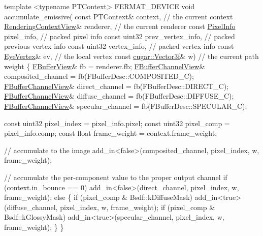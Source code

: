 \begin{DoxyCodeInclude}
    \textcolor{keyword}{template} <\textcolor{keyword}{typename} PTContext>
    FERMAT\_DEVICE
    \textcolor{keywordtype}{void} accumulate\_emissive(
        \textcolor{keyword}{const} PTContext&            context,                \textcolor{comment}{// the current context}
              \hyperlink{struct_rendering_context_view}{RenderingContextView}& renderer,               \textcolor{comment}{// the current renderer}
        \textcolor{keyword}{const} \hyperlink{union_pixel_info}{PixelInfo}                pixel\_info,             \textcolor{comment}{// packed pixel info}
        \textcolor{keyword}{const} uint32                prev\_vertex\_info,       \textcolor{comment}{// packed previous vertex info}
        \textcolor{keyword}{const} uint32                vertex\_info,            \textcolor{comment}{// packed vertex info}
        \textcolor{keyword}{const} \hyperlink{struct_eye_vertex}{EyeVertex}&           ev,                     \textcolor{comment}{// the local vertex}
        \textcolor{keyword}{const} \hyperlink{structcugar_1_1_vector}{cugar::Vector3f}&       w)                      \textcolor{comment}{// the current path weight}
    \{
        \hyperlink{struct_f_buffer_view}{FBufferView}& fb = renderer.fb;
        \hyperlink{struct_f_buffer_channel_view}{FBufferChannelView}& composited\_channel = fb(FBufferDesc::COMPOSITED\_C);
        \hyperlink{struct_f_buffer_channel_view}{FBufferChannelView}& direct\_channel     = fb(FBufferDesc::DIRECT\_C);
        \hyperlink{struct_f_buffer_channel_view}{FBufferChannelView}& diffuse\_channel    = fb(FBufferDesc::DIFFUSE\_C);
        \hyperlink{struct_f_buffer_channel_view}{FBufferChannelView}& specular\_channel   = fb(FBufferDesc::SPECULAR\_C);

        \textcolor{keyword}{const} uint32 pixel\_index = pixel\_info.pixel;
        \textcolor{keyword}{const} uint32 pixel\_comp  = pixel\_info.comp;
        \textcolor{keyword}{const} \textcolor{keywordtype}{float} frame\_weight = context.frame\_weight;

        \textcolor{comment}{// accumulate to the image}
        add\_in<false>(composited\_channel, pixel\_index, w, frame\_weight);

        \textcolor{comment}{// accumulate the per-component value to the proper output channel}
        \textcolor{keywordflow}{if} (context.in\_bounce == 0)
            add\_in<false>(direct\_channel, pixel\_index, w, frame\_weight);
        \textcolor{keywordflow}{else}
        \{
            \textcolor{keywordflow}{if} (pixel\_comp & Bsdf::kDiffuseMask) add\_in<true>(diffuse\_channel,  pixel\_index, w, 
      frame\_weight);
            \textcolor{keywordflow}{if} (pixel\_comp & Bsdf::kGlossyMask)  add\_in<true>(specular\_channel, pixel\_index, w, 
      frame\_weight);
        \}
    \}
\end{DoxyCodeInclude}
